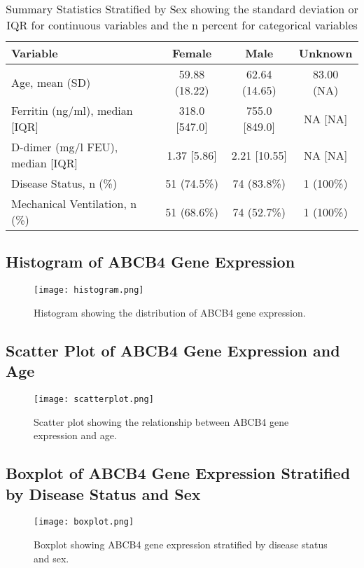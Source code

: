 \documentclass{article}
\begin{document}
\begin{table}[ht]
\centering
\caption{Summary Statistics Stratified by Sex showing the standard deviation or IQR for continuous variables and the n percent for categorical variables} %
\begin{tabular}{lccc}
\hline
Variable & Female & Male & Unknown \\
\hline
Age, mean (SD) & 59.88 (18.22) & 62.64 (14.65) & 83.00 (NA) \\
Ferritin (ng/ml), median [IQR] & 318.0 [547.0] & 755.0 [849.0] & NA [NA] \\
D-dimer (mg/l FEU), median [IQR] & 1.37 [5.86] & 2.21 [10.55] & NA [NA] \\
Disease Status, n (\%) & 51 (74.5\%) & 74 (83.8\%) & 1 (100\%) \\
Mechanical Ventilation, n (\%) & 51 (68.6\%) & 74 (52.7\%) & 1 (100\%) \\
\hline
\end{tabular}
\end{table}


\subsection{Histogram of ABCB4 Gene Expression}
\begin{figure}[H]
\centering
\texttt{[image: histogram.png]}
\caption{Histogram showing the distribution of ABCB4 gene expression.}
\label{fig:histogram}
\end{figure}

\subsection{Scatter Plot of ABCB4 Gene Expression and Age}
\begin{figure}[H]
\centering
\texttt{[image: scatterplot.png]}
\caption{Scatter plot showing the relationship between ABCB4 gene expression and age.}
\label{fig:scatter}
\end{figure}

\subsection{Boxplot of ABCB4 Gene Expression Stratified by Disease Status and Sex}
\begin{figure}[H]
\centering
\texttt{[image: boxplot.png]}
\caption{Boxplot showing ABCB4 gene expression stratified by disease status and sex.}
\label{fig:boxplot}
\end{figure}
\end{document}
